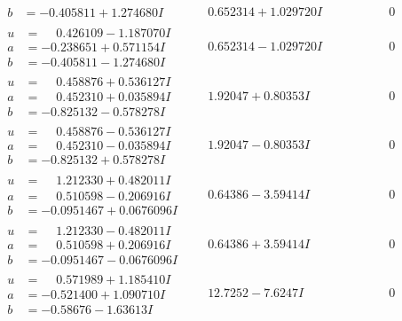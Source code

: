 \documentclass[1p]{elsarticle_modified}
\theoremstyle{definition}
\begin{document}
$$\begin{array}{c|c|c}
\begin{aligned}
b &= -0.405811 + 1.274680 I\end{aligned}
 & \phantom{-}0.652314 + 1.029720 I & \phantom{-0.000000 } 0 \\ \hline\begin{aligned}
u &= \phantom{-}0.426109 - 1.187070 I \\
a &= -0.238651 + 0.571154 I \\
b &= -0.405811 - 1.274680 I\end{aligned}
 & \phantom{-}0.652314 - 1.029720 I & \phantom{-0.000000 } 0 \\ \hline\begin{aligned}
u &= \phantom{-}0.458876 + 0.536127 I \\
a &= \phantom{-}0.452310 + 0.035894 I \\
b &= -0.825132 - 0.578278 I\end{aligned}
 & \phantom{-}1.92047 + 0.80353 I & \phantom{-0.000000 } 0 \\ \hline\begin{aligned}
u &= \phantom{-}0.458876 - 0.536127 I \\
a &= \phantom{-}0.452310 - 0.035894 I \\
b &= -0.825132 + 0.578278 I\end{aligned}
 & \phantom{-}1.92047 - 0.80353 I & \phantom{-0.000000 } 0 \\ \hline\begin{aligned}
u &= \phantom{-}1.212330 + 0.482011 I \\
a &= \phantom{-}0.510598 - 0.206916 I \\
b &= -0.0951467 + 0.0676096 I\end{aligned}
 & \phantom{-}0.64386 - 3.59414 I & \phantom{-0.000000 } 0 \\ \hline\begin{aligned}
u &= \phantom{-}1.212330 - 0.482011 I \\
a &= \phantom{-}0.510598 + 0.206916 I \\
b &= -0.0951467 - 0.0676096 I\end{aligned}
 & \phantom{-}0.64386 + 3.59414 I & \phantom{-0.000000 } 0 \\ \hline\begin{aligned}
u &= \phantom{-}0.571989 + 1.185410 I \\
a &= -0.521400 + 1.090710 I \\
b &= -0.58676 - 1.63613 I\end{aligned}
 & \phantom{-}12.7252 - 7.6247 I & \phantom{-0.000000 } 0 \\ \hline\begin{aligned}

\end{aligned}
\end{array}$$
\end{document}
